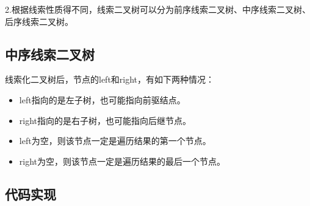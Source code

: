 \documentclass[a4paper]{report}
\begin{document}
2.根据线索性质得不同，线索二叉树可以分为前序线索二叉树、中序线索二叉树、后序线索二叉树。
\subsection{中序线索二叉树}
线索化二叉树后，节点的left和right，有如下两种情况：
\begin{itemize}
  \item left指向的是左子树，也可能指向前驱结点。
  \item right指向的是右子树，也可能指向后继节点。
  \item left为空，则该节点一定是遍历结果的第一个节点。
  \item  right为空，则该节点一定是遍历结果的最后一个节点。
\end{itemize}
\subsection{代码实现}
\end{document}
